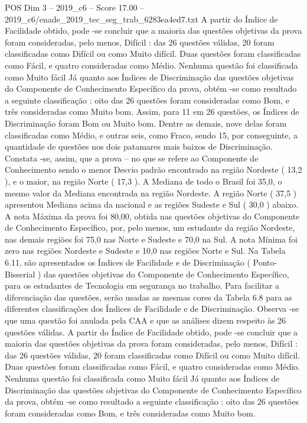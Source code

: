 \begin{textsample}{POS Dim 3 – 2019\_c6 – Score 17.00 – 2019\_c6/enade\_2019\_tec\_seg\_trab\_6283ea4ed7.txt}
A partir do Índice de Facilidade obtido, pode -se concluir que a maioria das questões objetivas da prova foram consideradas, pelo menos, Difícil : das 26 questões válidas, 20 foram classificadas como Difícil ou como Muito difícil.
Duas questões foram classificadas como Fácil, e quatro consideradas como Médio.
Nenhuma questão foi classificada como Muito fácil Já quanto aos Índices de Discriminação das questões objetivas do Componente de Conhecimento Específico da prova, obtém -se como resultado a seguinte classificação : oito das 26 questões foram consideradas como Bom, e três consideradas como Muito bom.
Assim, para 11 em 26 questões, os Índices de Discriminação foram Bom ou Muito bom.
Dentre as demais, nove delas foram classificadas como Médio, e outras seis, como Fraco, sendo 15, por conseguinte, a quantidade de questões nos dois patamares mais baixos de Discriminação.
Constata -se, assim, que a prova – no que se refere ao Componente de Conhecimento sendo o menor Desvio padrão encontrado na região Nordeste ( 13,2 ), e o maior, na região Norte ( 17,3 ).
A Mediana de todo o Brasil foi 35,0, o mesmo valor da Mediana encontrada na região Nordeste.
A região Norte ( 37,5 ) apresentou Mediana acima da nacional e as regiões Sudeste e Sul ( 30,0 ) abaixo.
A nota Máxima da prova foi 80,00, obtida nas questões objetivas do Componente de Conhecimento Específico, por, pelo menos, um estudante da região Nordeste, nas demais regiões foi 75,0 nas Norte e Sudeste e 70,0 na Sul.
A nota Mínima foi zero nas regiões Nordeste e Sudeste e 10,0 nas regiões Norte e Sul.
Na Tabela 6.11, são apresentados os Índices de Facilidade e de Discriminação ( Ponto-Bisserial ) das questões objetivas do Componente de Conhecimento Específico, para os estudantes de Tecnologia em segurança no trabalho.
Para facilitar a diferenciação das questões, serão usadas as mesmas cores da Tabela 6.8 para as diferentes classificações dos Índices de Facilidade e de Discriminação.
Observa -se que uma questão foi anulada pela CAA e que as análises dizem respeito às 26 questões válidas.
A partir do Índice de Facilidade obtido, pode -se concluir que a maioria das questões objetivas da prova foram consideradas, pelo menos, Difícil : das 26 questões válidas, 20 foram classificadas como Difícil ou como Muito difícil.
Duas questões foram classificadas como Fácil, e quatro consideradas como Médio.
Nenhuma questão foi classificada como Muito fácil Já quanto aos Índices de Discriminação das questões objetivas do Componente de Conhecimento Específico da prova, obtém -se como resultado a seguinte classificação : oito das 26 questões foram consideradas como Bom, e três consideradas como Muito bom.

\end{textsample}
